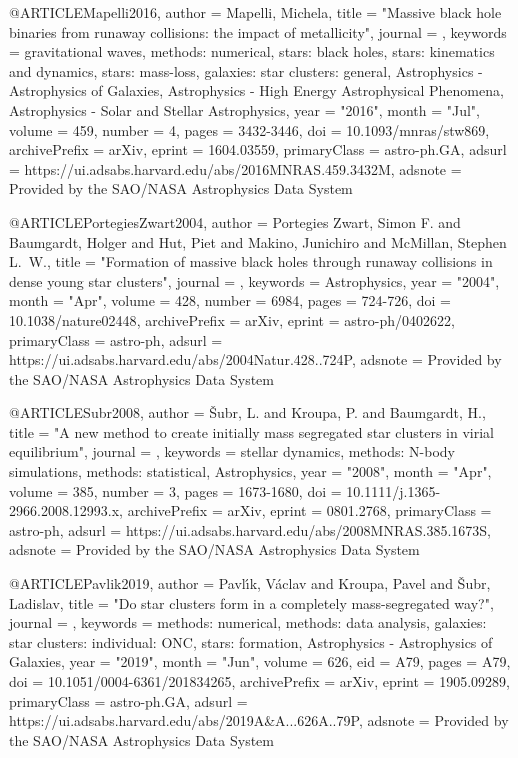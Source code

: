 \documentclass[twocolumn,tighten]{aastex63}
\begin{document}
@ARTICLE{Mapelli2016,
       author = {{Mapelli}, Michela},
        title = "{Massive black hole binaries from runaway collisions: the impact of metallicity}",
      journal = {\mnras},
     keywords = {gravitational waves, methods: numerical, stars: black holes, stars: kinematics and dynamics, stars: mass-loss, galaxies: star clusters: general, Astrophysics - Astrophysics of Galaxies, Astrophysics - High Energy Astrophysical Phenomena, Astrophysics - Solar and Stellar Astrophysics},
         year = "2016",
        month = "Jul",
       volume = {459},
       number = {4},
        pages = {3432-3446},
          doi = {10.1093/mnras/stw869},
archivePrefix = {arXiv},
       eprint = {1604.03559},
 primaryClass = {astro-ph.GA},
       adsurl = {https://ui.adsabs.harvard.edu/abs/2016MNRAS.459.3432M},
      adsnote = {Provided by the SAO/NASA Astrophysics Data System}
}

@ARTICLE{PortegiesZwart2004,
       author = {{Portegies Zwart}, Simon F. and {Baumgardt}, Holger and {Hut}, Piet and
         {Makino}, Junichiro and {McMillan}, Stephen L.~W.},
        title = "{Formation of massive black holes through runaway collisions in dense young star clusters}",
      journal = {\nat},
     keywords = {Astrophysics},
         year = "2004",
        month = "Apr",
       volume = {428},
       number = {6984},
        pages = {724-726},
          doi = {10.1038/nature02448},
archivePrefix = {arXiv},
       eprint = {astro-ph/0402622},
 primaryClass = {astro-ph},
       adsurl = {https://ui.adsabs.harvard.edu/abs/2004Natur.428..724P},
      adsnote = {Provided by the SAO/NASA Astrophysics Data System}
}

@ARTICLE{Subr2008,
       author = {{{\v{S}}ubr}, L. and {Kroupa}, P. and {Baumgardt}, H.},
        title = "{A new method to create initially mass segregated star clusters in virial equilibrium}",
      journal = {\mnras},
     keywords = {stellar dynamics, methods: N-body simulations, methods: statistical, Astrophysics},
         year = "2008",
        month = "Apr",
       volume = {385},
       number = {3},
        pages = {1673-1680},
          doi = {10.1111/j.1365-2966.2008.12993.x},
archivePrefix = {arXiv},
       eprint = {0801.2768},
 primaryClass = {astro-ph},
       adsurl = {https://ui.adsabs.harvard.edu/abs/2008MNRAS.385.1673S},
      adsnote = {Provided by the SAO/NASA Astrophysics Data System}
}

@ARTICLE{Pavlik2019,
       author = {{Pavl{\'\i}k}, V{\'a}clav and {Kroupa}, Pavel and {{\v{S}}ubr}, Ladislav},
        title = "{Do star clusters form in a completely mass-segregated way?}",
      journal = {\aap},
     keywords = {methods: numerical, methods: data analysis, galaxies: star clusters: individual: ONC, stars: formation, Astrophysics - Astrophysics of Galaxies},
         year = "2019",
        month = "Jun",
       volume = {626},
          eid = {A79},
        pages = {A79},
          doi = {10.1051/0004-6361/201834265},
archivePrefix = {arXiv},
       eprint = {1905.09289},
 primaryClass = {astro-ph.GA},
       adsurl = {https://ui.adsabs.harvard.edu/abs/2019A&A...626A..79P},
      adsnote = {Provided by the SAO/NASA Astrophysics Data System}
}
\end{document}
